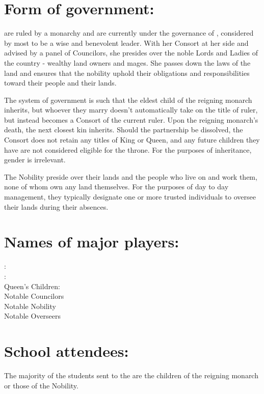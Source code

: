 \documentclass[blue]{GL2020}
\begin{document}
\name{\bAgrarians{}}

\section*{Form of government:}

\pSun{} are ruled by a monarchy and are currently under the governance of \cQueen{}, considered by most to be a wise and benevolent leader.  With her Consort at her side and advised by a panel of Councilors, she presides over the noble Lords and Ladies of the country - wealthy land owners and mages.  She passes down the laws of the land and ensures that the nobility uphold their obligations and responsibilities toward their people and their lands.

The system of government is such that the eldest child of the reigning monarch inherits, but whoever they marry doesn't automatically take on the title of ruler, but instead becomes a Consort of the current ruler.  Upon the reigning monarch's death, the next closest kin inherits.  Should the partnership be dissolved, the Consort does not retain any titles of King or Queen, and any future children they have are not considered eligible for the throne.  For the purposes of inheritance, gender is irrelevant.

The Nobility preside over their lands and the people who live on and work them, none of whom own any land themselves.  For the purposes of day to day management, they typically designate one or more trusted individuals to oversee their lands during their absences.

\section*{Names of major players:}

\cQueen{}:\\
\cConsort{}:\\
Queen's Children:\\
Notable Councilors\\
Notable Nobility\\
Notable Overseers\\

\section*{School attendees:}

The majority of the students sent to the \pSchool{} are the children of the reigning monarch or those of the Nobility.
\end{document}
